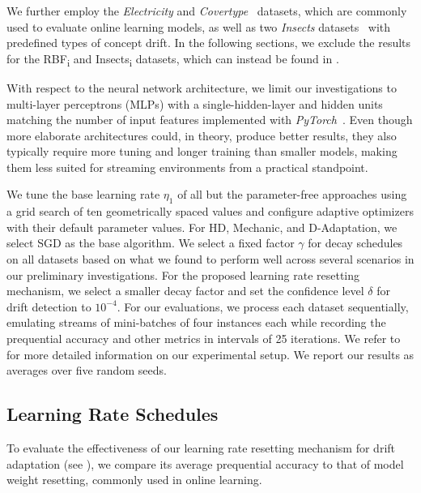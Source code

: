 \documentclass{article} %
\begin{document}

We further employ the \textit{Electricity} and \textit{Covertype}~\citep{misc_covertype_31} datasets, which are commonly used to evaluate online learning models, as well as two \textit{Insects} datasets~\citep{souzaChallengesBenchmarkingStream2020} with predefined types of concept drift.
In the following sections, we exclude the results for the RBF\textsubscript{i} and Insects\textsubscript{i} datasets, which can instead be found in .

With respect to the neural network architecture, we limit our investigations to multi-layer perceptrons (MLPs) with a single-hidden-layer and hidden units matching the number of input features implemented with \textit{PyTorch}~\citep{paszkePyTorchImperativeStyle2019}.
Even though more elaborate architectures could, in theory, produce better results, they also typically require more tuning and longer training than smaller models, making them less suited for streaming environments from a practical standpoint.

We tune the base learning rate $\eta_1$ of all but the parameter-free approaches using a grid search of ten geometrically spaced values and configure adaptive optimizers with their default parameter values. For HD, Mechanic, and D-Adaptation, we select SGD as the base algorithm.
We select a fixed factor $\gamma$ for decay schedules on all datasets based on what we found to perform well across several scenarios in our preliminary investigations.
For the proposed learning rate resetting mechanism, we select a smaller decay factor and set the confidence level $\delta$ for drift detection to $10^{-4}$.
For our evaluations, we process each dataset sequentially, emulating streams of mini-batches of four instances each while recording the prequential accuracy and other metrics in intervals of 25 iterations.
We refer to  for more detailed information on our experimental setup.
We report our results as averages over five random seeds.

\subsection{Learning Rate Schedules}

To evaluate the effectiveness of our learning rate resetting mechanism for drift adaptation (see ), we compare its average prequential accuracy to that of model weight resetting, commonly used in online learning.
\end{document}
